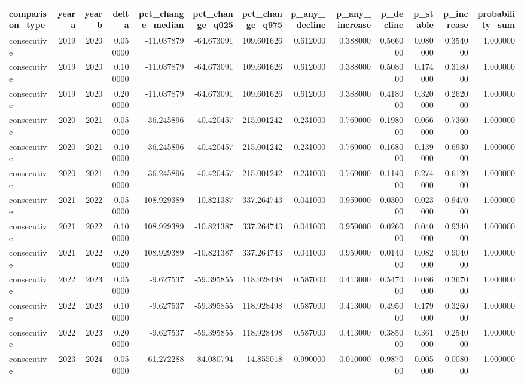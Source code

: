 \begin{tabular}{lrrrrrrrrrrrr}
\toprule
comparison\_type & year\_a & year\_b & delta & pct\_change\_median & pct\_change\_q025 & pct\_change\_q975 & p\_any\_decline & p\_any\_increase & p\_decline & p\_stable & p\_increase & probability\_sum \\
\midrule
consecutive & 2019 & 2020 & 0.050000 & -11.037879 & -64.673091 & 109.601626 & 0.612000 & 0.388000 & 0.566000 & 0.080000 & 0.354000 & 1.000000 \\
consecutive & 2019 & 2020 & 0.100000 & -11.037879 & -64.673091 & 109.601626 & 0.612000 & 0.388000 & 0.508000 & 0.174000 & 0.318000 & 1.000000 \\
consecutive & 2019 & 2020 & 0.200000 & -11.037879 & -64.673091 & 109.601626 & 0.612000 & 0.388000 & 0.418000 & 0.320000 & 0.262000 & 1.000000 \\
consecutive & 2020 & 2021 & 0.050000 & 36.245896 & -40.420457 & 215.001242 & 0.231000 & 0.769000 & 0.198000 & 0.066000 & 0.736000 & 1.000000 \\
consecutive & 2020 & 2021 & 0.100000 & 36.245896 & -40.420457 & 215.001242 & 0.231000 & 0.769000 & 0.168000 & 0.139000 & 0.693000 & 1.000000 \\
consecutive & 2020 & 2021 & 0.200000 & 36.245896 & -40.420457 & 215.001242 & 0.231000 & 0.769000 & 0.114000 & 0.274000 & 0.612000 & 1.000000 \\
consecutive & 2021 & 2022 & 0.050000 & 108.929389 & -10.821387 & 337.264743 & 0.041000 & 0.959000 & 0.030000 & 0.023000 & 0.947000 & 1.000000 \\
consecutive & 2021 & 2022 & 0.100000 & 108.929389 & -10.821387 & 337.264743 & 0.041000 & 0.959000 & 0.026000 & 0.040000 & 0.934000 & 1.000000 \\
consecutive & 2021 & 2022 & 0.200000 & 108.929389 & -10.821387 & 337.264743 & 0.041000 & 0.959000 & 0.014000 & 0.082000 & 0.904000 & 1.000000 \\
consecutive & 2022 & 2023 & 0.050000 & -9.627537 & -59.395855 & 118.928498 & 0.587000 & 0.413000 & 0.547000 & 0.086000 & 0.367000 & 1.000000 \\
consecutive & 2022 & 2023 & 0.100000 & -9.627537 & -59.395855 & 118.928498 & 0.587000 & 0.413000 & 0.495000 & 0.179000 & 0.326000 & 1.000000 \\
consecutive & 2022 & 2023 & 0.200000 & -9.627537 & -59.395855 & 118.928498 & 0.587000 & 0.413000 & 0.385000 & 0.361000 & 0.254000 & 1.000000 \\
consecutive & 2023 & 2024 & 0.050000 & -61.272288 & -84.080794 & -14.855018 & 0.990000 & 0.010000 & 0.987000 & 0.005000 & 0.008000 & 1.000000 \\

\end{tabular}
